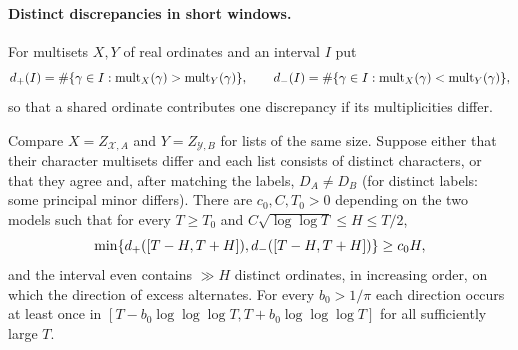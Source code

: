 \paragraph{Distinct discrepancies in short windows.}
For multisets $X,Y$ of real ordinates and an interval $I$ put
\[
 d_+(I)=\#\{\gamma\in I:\operatorname{mult}_X(\gamma)>\operatorname{mult}_Y(\gamma)\},\qquad
 d_-(I)=\#\{\gamma\in I:\operatorname{mult}_X(\gamma)<\operatorname{mult}_Y(\gamma)\},
\]
so that a shared ordinate contributes one discrepancy if its multiplicities differ.

\begin{theorem}\label{zer:thm:localcoupled}
Compare $X=Z_{\mathcal X,A}$ and $Y=Z_{\mathcal Y,B}$ for lists of the same size. Suppose either that their
character multisets differ and each list consists of distinct characters, or that they agree and, after matching the labels, $D_A\ne D_B$ (for distinct
labels: some principal minor differs). There are $c_0,C,T_0>0$ depending on the two models such that for
every $T\ge T_0$ and $C\sqrt{\log\log T}\le H\le T/2$,
\[
 \min\{d_+([T-H,T+H]),d_-([T-H,T+H])\}\ge c_0H ,
\]
and the interval even contains $\gg H$ distinct ordinates, in increasing order, on which the direction of
excess alternates. For every $b_0>1/\pi$ each direction occurs at least once in
$[T-b_0\log\log\log T,T+b_0\log\log\log T]$ for all sufficiently large $T$.
\end{theorem}

